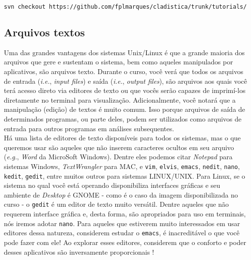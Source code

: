 \begin{center}
\small \texttt{svn checkout https://github.com/fplmarques/cladistica/trunk/tutorials/}\\
\end{center}

\newpage
\pagestyle{fancy} %
\begin{refsection}
\renewcommand*{\finalnamedelim}{\addspace\&\space}%

\section{Arquivos textos}\label{tut2:text}
	Uma das grandes vantagens dos sistemas Unix/Linux é que a grande maioria dos arquivos que gere e sustentam o sistema, bem como aqueles manipulados por aplicativos, são arquivos texto. Durante o curso, você verá que todos os arquivos de entrada (\textit{i.e.}, \textit{input files}) e saída (\textit{i.e.}, \textit{output files}), são arquivos aos quais você terá acesso direto via editores de texto ou que vocês serão capazes de imprimí-los diretamente no terminal para visualização. Adicionalmente, você notará que a manipulação (edição) de textos é muito comum. Isso porque arquivos de saída de determinados programas, ou parte deles, podem ser utilizados como arquivos de entrada para outros programas em análises subsequentes.\\

	Há uma lista de editores de texto disponíveis para todos os sistemas, mas o que queremos usar são aqueles que não inserem caracteres ocultos em seu arquivo (\textit{e.g.}, \textit{Word} da MicroSoft Windows). Dentre eles podemos citar \textit{Notepad} para sistemas Windows, \textit{TextWrangler} para MAC, e \texttt{vim}, \texttt{elvis}, \texttt{emacs}, \texttt{nedit}, \texttt{nano}, \texttt{kedit}, \texttt{gedit}, entre muitos outros para sistemas LINUX/UNIX. Para Linux, se o sistema no qual você está operando disponibiliza interfaces gráficas e seu ambiente de \textit{Desktop} é GNOME - como é o caso da imagem disponibilizada no curso - o \texttt{gedit} é um editor de texto muito versátil. Dentre aqueles que não requerem interface gráfica e, desta forma, são apropriados para uso em terminais, nós iremos adotar \texttt{nano}. Para aqueles que estiverem muito interessados em usar editores dessa natureza, considerem estudar o \texttt{emacs}, é inacreditável o que você pode fazer com ele! Ao explorar esses 
editores, considerem que o conforto e poder desses aplicativos são inversamente proporcionais \parencite [] [] {Wunchiers_2004,}!\\


\end{refsection}
